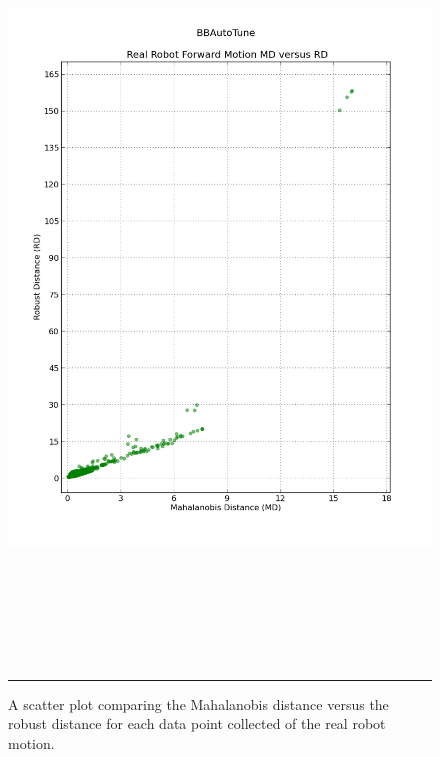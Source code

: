 \begin{figure}[htbp]
\centering
\includegraphics[height=8in]{../Figures/Chapter4/real_robot_md_vs_rd.png}
\rule{35em}{0.5pt}
\caption[Real Robot Forward Motion MD versus RD]{A scatter plot comparing the Mahalanobis distance versus the robust distance for each data point collected of the real robot motion.}
\label{fig:real_robot_md_vs_rd}
\end{figure}

